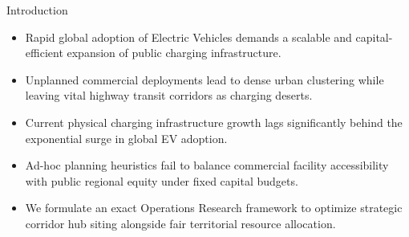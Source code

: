 \documentclass[aspectratio=169,10pt]{beamer}
\begin{document}
\begin{frame}{Introduction}
  \vspace{0.35cm}
  \begin{itemize}\setlength{\itemsep}{0.45cm}
    \item Rapid global adoption of Electric Vehicles demands a scalable and capital-efficient expansion of public charging infrastructure.
    \item Unplanned commercial deployments lead to dense urban clustering while leaving vital highway transit corridors as charging deserts.
    \item Current physical charging infrastructure growth lags significantly behind the exponential surge in global EV adoption.
    \item Ad-hoc planning heuristics fail to balance commercial facility accessibility with public regional equity under fixed capital budgets.
    \item We formulate an exact Operations Research framework to optimize strategic corridor hub siting alongside fair territorial resource allocation.
  \end{itemize}
\end{frame}
\end{document}
